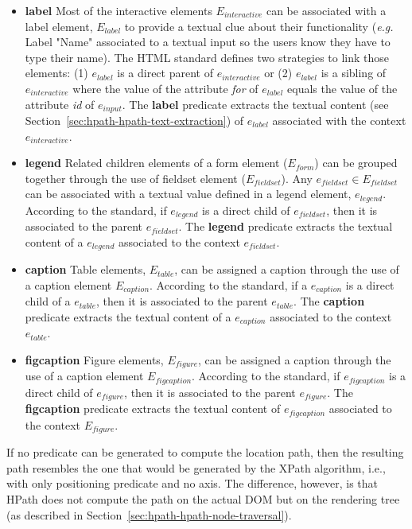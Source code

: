 \begin{itemize}
    \item \textbf{label} Most of the interactive elements $E_{interactive}$ can be associated with a label element, $E_{label}$ to provide a textual clue about their functionality (\emph{e.g.} Label "Name" associated to a textual input so the users know they have to type their name). The HTML standard defines two strategies to link those elements: (1) $e_{label}$ is a direct parent of $e_{interactive}$ or (2) $e_{label}$ is a sibling of $e_{interactive}$ where the value of the attribute \emph{for} of $e_{label}$ equals the value of the attribute \emph{id} of $e_{input}$. The \textbf{label} predicate extracts the textual content (see Section~\ref{sec:hpath-hpath-text-extraction}) of $e_{label}$ associated with the context $e_{interactive}$. 
    
    \item \textbf{legend} Related children elements of a form element ($E_{form}$) can be grouped together through the use of fieldset element ($E_{fieldset}$). Any $e_{fieldset} \in E_{fieldset}$ can be associated with a textual value defined in a legend element, $e_{legend}$. According to the standard, if $e_{legend}$ is a direct child of $e_{fieldset}$, then it is associated to the parent $e_{fieldset}$. The \textbf{legend} predicate extracts the textual content of a $e_{legend}$ associated to the context $e_{fieldset}$. 
    
    \item \textbf{caption} Table elements, $E_{table}$, can be assigned a caption through the use of a caption element $E_{caption}$. According to the standard, if a $e_{caption}$ is a direct child of a $e_{table}$, then it is associated to the parent $e_{table}$. The \textbf{caption} predicate extracts the textual content of a $e_{caption}$ associated to the context $e_{table}$. 
    
    \item \textbf{figcaption} Figure elements, $E_{figure}$, can be assigned a caption through the use of a caption element $E_{figcaption}$. According to the standard, if $e_{figcaption}$ is a direct child of $e_{figure}$, then it is associated to the parent $e_{figure}$. The \textbf{figcaption} predicate extracts the textual content of $e_{figcaption}$ associated to the context $E_{figure}$. 
\end{itemize}

If no predicate can be generated to compute the location path, then the resulting path resembles the one that would be generated by the XPath algorithm, i.e., with only positioning predicate and no axis. The difference, however, is that HPath does not compute the path on the actual DOM but on the rendering tree (as described in Section~\ref{sec:hpath-hpath-node-traversal}).

